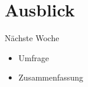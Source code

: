 

\section{Ausblick}
\BlueSectionSlide
\begin{frame}{Nächste Woche}
    \begin{itemize}
        \item[\textbullet] Umfrage 
        \item[\textbullet] Zusammenfassung
    \end{itemize}

\end{frame}










